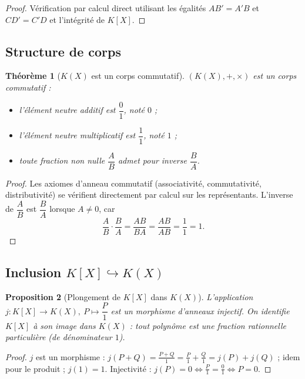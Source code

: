 \documentclass[12pt,a4paper]{report}
\newtheorem{theoreme}{Théorème}[section]
\newtheorem{proposition}[theoreme]{Proposition}
\theoremstyle{definition}
\theoremstyle{remark}
\begin{document}
\begin{proof}
Vérification par calcul direct utilisant les égalités $AB' = A'B$ et $CD' = C'D$ et l'intégrité de $K[X]$.
\end{proof}

\subsection{Structure de corps}

\begin{theoreme}[$K(X)$ est un corps commutatif]
$(K(X), +, \times)$ est un \emph{corps commutatif} :
\begin{itemize}
    \item l'élément neutre additif est $\dfrac{0}{1}$, noté $0$ ;
    \item l'élément neutre multiplicatif est $\dfrac{1}{1}$, noté $1$ ;
    \item toute fraction non nulle $\dfrac{A}{B}$ admet pour inverse $\dfrac{B}{A}$.
\end{itemize}
\end{theoreme}

\begin{proof}
Les axiomes d'anneau commutatif (associativité, commutativité, distributivité) se vérifient directement par calcul sur les représentants. L'inverse de $\dfrac{A}{B}$ est $\dfrac{B}{A}$ lorsque $A \neq 0$, car
\[ \frac{A}{B} \cdot \frac{B}{A} = \frac{AB}{BA} = \frac{AB}{AB} = \frac{1}{1} = 1. \]
\end{proof}

\subsection{Inclusion $K[X] \hookrightarrow K(X)$}

\begin{proposition}[{Plongement de $K[X]$ dans $K(X)$}]
L'application $j : K[X] \to K(X),\ P \mapsto \dfrac{P}{1}$ est un morphisme d'anneaux \emph{injectif}. On identifie $K[X]$ à son image dans $K(X)$ : tout polynôme est une fraction rationnelle particulière (de dénominateur $1$).
\end{proposition}

\begin{proof}
$j$ est un morphisme : $j(P + Q) = \frac{P + Q}{1} = \frac{P}{1} + \frac{Q}{1} = j(P) + j(Q)$ ; idem pour le produit ; $j(1) = 1$.
Injectivité : $j(P) = 0 \iff \frac{P}{1} = \frac{0}{1} \iff P = 0$.
\end{proof}
\end{document}
